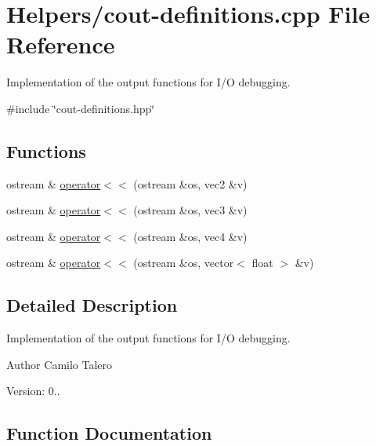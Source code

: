 \hypertarget{cout-definitions_8cpp}{}\section{Helpers/cout-\/definitions.cpp File Reference}
\label{cout-definitions_8cpp}


Implementation of the output functions for I/O debugging.  


{\ttfamily \#include \char`\"{}cout-\/definitions.\+hpp\char`\"{}}\newline
\subsection*{Functions}
\begin{DoxyCompactItemize}
\item 
ostream \& \mbox{\hyperlink{cout-definitions_8cpp_a423721485bc58bbd87f25262fc5748b7}{operator$<$$<$}} (ostream \&os, vec2 \&v)
\item 
ostream \& \mbox{\hyperlink{cout-definitions_8cpp_a9785ea3eade9968a62d5e9836f720617}{operator$<$$<$}} (ostream \&os, vec3 \&v)
\item 
ostream \& \mbox{\hyperlink{cout-definitions_8cpp_aced74fdd5c32b973692a20e6272a5f56}{operator$<$$<$}} (ostream \&os, vec4 \&v)
\item 
ostream \& \mbox{\hyperlink{cout-definitions_8cpp_a337249c538c5d8304a68a31ecc936c81}{operator$<$$<$}} (ostream \&os, vector$<$ float $>$ \&v)
\end{DoxyCompactItemize}


\subsection{Detailed Description}
Implementation of the output functions for I/O debugging. 

\begin{DoxyAuthor}{Author}
Camilo Talero
\end{DoxyAuthor}
Version\+: 0.. 

\subsection{Function Documentation}
\mbox{\label{cout-definitions_8cpp_a423721485bc58bbd87f25262fc5748b7}} 
